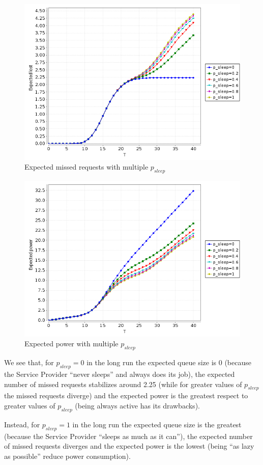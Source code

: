 \begin{figure}[htb]
  \centering
  \includegraphics[width=13cm]{quantitative-project/expected-missed-requests-with-psleep.png}
  \caption{Expected missed requests with multiple $p_{sleep}$}
  \label{fig:expected-missed-requests-with-psleep}
\end{figure}
\begin{figure}[htb]
  \centering
  \includegraphics[width=13cm]{quantitative-project/expected-power-with-psleep.png}
  \caption{Expected power with multiple $p_{sleep}$}
  \label{fig:expected-power-psleep}
\end{figure}
We see that, for $p_{sleep} = 0$ in the long run the expected queue
size is 0 (because the Service Provider ``never sleeps'' and always
does its job), the expected number of missed requests stabilizes
around 2.25 (while for greater values of $p_{sleep}$ the missed
requests diverge) and the expected power is the greatest respect to
greater values of $p_{sleep}$ (being always active has its drawbacks).

Instead, for $p_{sleep} = 1$ in the long run the expected queue size
is the greatest (because the Service Provider ``sleeps as much as it
can''), the expected number of missed requests diverges and the
expected power is the lowest (being ``as lazy as possible'' reduce
power consumption).
